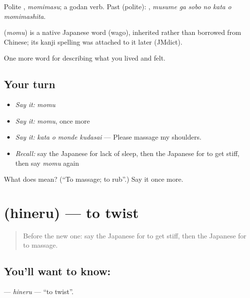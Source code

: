 Polite \textbf{}, \emph{momimasu}; a godan verb. Past (polite): \textbf{   }, \emph{musume ga sobo no kata o momimashita}.

\begin{cousinweb}
\textbf{} (\emph{momu}) is a native Japanese word (wago), inherited rather than borrowed from Chinese; its kanji spelling was attached to it later (JMdict).
\end{cousinweb}

\begin{grammarlens}[title={What you've built}]
One more word for describing what you lived and felt.
\end{grammarlens}

\subsection*{Your turn}
\begin{itemize}
\raggedright
  \item \emph{Say it:} \emph{momu}
  \item \emph{Say it:} \emph{momu}, once more
  \item \emph{Say it:} \emph{kata o monde kudasai} — Please massage my shoulders.
  \item \emph{Recall:} say the Japanese for lack of sleep, then the Japanese for to get stiff, then say \emph{momu} again
\end{itemize}

\begin{tcolorbox}[breakable,colback=teal!4,colframe=teal!35!black,title={Before you move on}]
What does  mean? (\textquotedblleft{}To massage; to rub\textquotedblright{}.) Say it once more.
\end{tcolorbox}
\section[\texorpdfstring{\ja{ひねる} (hineru)}{ひねる (hineru)}]{ (hineru) — to twist}

\label{lesson:JA-C448-hineru}



\begin{quote}
Before the new one: say the Japanese for to get stiff, then the Japanese for to massage.
\end{quote}

\subsection*{You'll want to know: }
\textbf{} — \emph{hineru} — \textquotedblleft{}to twist\textquotedblright{}.

